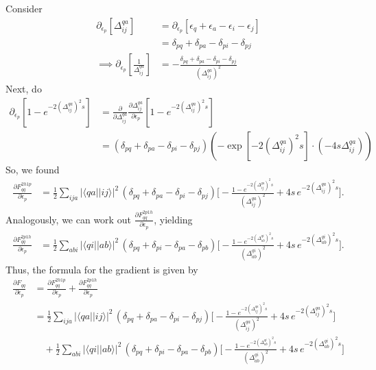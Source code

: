 Consider 
\begin{align}
    \partial_{\epsilon_p} \left[\Delta_{i j}^{q a}\right] & = \partial_{\epsilon_p} \left[ \epsilon_q + \epsilon_a - \epsilon_i - \epsilon_j \right]\\& = \delta_{pq} + \delta_{pa} - \delta_{pi} - \delta_{pj} \\
\implies \partial_{\epsilon_p} \left[ \frac{1}{\Delta_{i j}^{q a}} \right] & = -\frac{\delta_{pq} + \delta_{pa} - \delta_{pi} - \delta_{pj}}{\left(\Delta_{i j}^{q a}\right)^2}
\end{align}
Next, do
\begin{align}
    \partial_{\epsilon_p} \left[ 1 - e^{-2\left(\Delta_{i j}^{q a}\right)^2 s} \right] & = \frac{\partial}{\partial \Delta_{i j}^{q a}} \frac{\partial \Delta_{i j}^{q a}}{\partial \epsilon_p} \left[ 1 - e^{-2\left(\Delta_{i j}^{q a}\right)^2 s} \right] \\
&=  (\delta_{pq} + \delta_{pa} - \delta_{pi} - \delta_{pj}) \left( - \exp\left[-2\left(\Delta_{i j}^{q a}\right)^2 s\right] \cdot (-4s \Delta_{i j}^{q a}) \right) 
\end{align}
So, we found
\begin{align}
\frac{\partial F_{qq}^{2h1p}}{\partial \epsilon_p}
&= \frac{1}{2}\sum_{ija} |\langle qa||ij\rangle|^2\,
(\delta_{pq}+\delta_{pa}-\delta_{pi}-\delta_{pj})
\Biggl[
-\frac{1-e^{-2(\Delta_{ij}^{qa})^2 s}}{(\Delta_{ij}^{qa})^2}
+4s\,e^{-2(\Delta_{ij}^{qa})^2 s}
\Biggr].
\end{align}
Analogously, we can work out $\frac{\partial F_{qq}^{2p1h}}{\partial \epsilon_p}$, yielding
\begin{align}
\frac{\partial F_{qq}^{2p1h}}{\partial \epsilon_p}
&= \frac{1}{2}\sum_{abi} |\langle qi||ab\rangle|^2\,
(\delta_{pq}+\delta_{pi}-\delta_{pa}-\delta_{pb})
\Biggl[
-\frac{1-e^{-2(\Delta_{ab}^{qi})^2 s}}{(\Delta_{ab}^{qi})^2}
+4s\,e^{-2(\Delta_{ab}^{qi})^2 s}
\Biggr].
\end{align}
Thus, the formula for the gradient is given by
\begin{align}
\frac{\partial F_{qq}}{\partial \epsilon_p} 
&= \frac{\partial F_{qq}^{2h1p}}{\partial \epsilon_p} + \frac{\partial F_{qq}^{2p1h}}{\partial \epsilon_p} \nonumber\\
&= \frac{1}{2}\sum_{ija} |\langle qa||ij\rangle|^2\,
(\delta_{pq}+\delta_{pa}-\delta_{pi}-\delta_{pj})
\Biggl[
-\frac{1-e^{-2(\Delta_{ij}^{qa})^2 s}}{(\Delta_{ij}^{qa})^2}
+4s\,e^{-2(\Delta_{ij}^{qa})^2 s}
\Biggr] \nonumber\\
&\quad + \frac{1}{2}\sum_{abi} |\langle qi||ab\rangle|^2\,
(\delta_{pq}+\delta_{pi}-\delta_{pa}-\delta_{pb})
\Biggl[
-\frac{1-e^{-2(\Delta_{ab}^{qi})^2 s}}{(\Delta_{ab}^{qi})^2}
+4s\,e^{-2(\Delta_{ab}^{qi})^2 s}
\Biggr]
\end{align}
